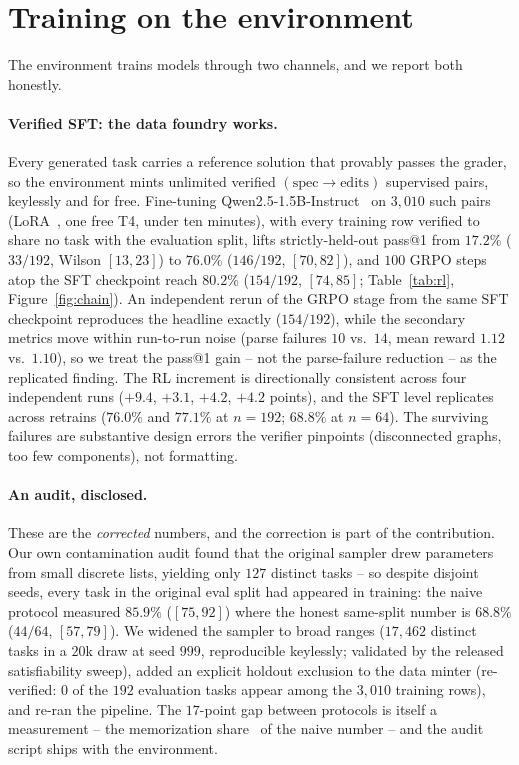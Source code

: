 \documentclass[11pt]{article}
\begin{document}
\section{Training on the environment}
\label{sec:rl}
The environment trains models through two channels, and we report both honestly.

\paragraph{Verified SFT: the data foundry works.} Every generated task carries a reference solution that provably passes the grader, so the environment mints unlimited verified $(\text{spec}\!\to\!\text{edits})$ supervised pairs, keylessly and for free. Fine-tuning Qwen2.5-1.5B-Instruct~\cite{qwen25} on $3{,}010$ such pairs (LoRA~\cite{lora}, one free T4, under ten minutes), with every training row verified to share no task with the evaluation split, lifts strictly-held-out pass@1 from $17.2\%$ ($33/192$, Wilson $[13,23]$) to $76.0\%$ ($146/192$, $[70,82]$), and $100$ GRPO steps atop the SFT checkpoint reach $\mathbf{80.2\%}$ ($154/192$, $[74,85]$; Table~\ref{tab:rl}, Figure~\ref{fig:chain}). An independent rerun of the GRPO stage from the same SFT checkpoint reproduces the headline exactly ($154/192$), while the secondary metrics move within run-to-run noise (parse failures $10$ vs.\ $14$, mean reward $1.12$ vs.\ $1.10$), so we treat the pass@1 gain -- not the parse-failure reduction -- as the replicated finding. The RL increment is directionally consistent across four independent runs ($+9.4$, $+3.1$, $+4.2$, $+4.2$ points), and the SFT level replicates across retrains ($76.0\%$ and $77.1\%$ at $n{=}192$; $68.8\%$ at $n{=}64$). The surviving failures are substantive design errors the verifier pinpoints (disconnected graphs, too few components), not formatting.

\paragraph{An audit, disclosed.} These are the \emph{corrected} numbers, and the correction is part of the contribution. Our own contamination audit found that the original sampler drew parameters from small discrete lists, yielding only $127$ distinct tasks -- so despite disjoint seeds, every task in the original eval split had appeared in training: the naive protocol measured $85.9\%$ ($[75,92]$) where the honest same-split number is $68.8\%$ ($44/64$, $[57,79]$). We widened the sampler to broad ranges ($17{,}462$ distinct tasks in a $20$k draw at seed $999$, reproducible keylessly; validated by the released satisfiability sweep), added an explicit holdout exclusion to the data minter (re-verified: $0$ of the $192$ evaluation tasks appear among the $3{,}010$ training rows), and re-ran the pipeline. The $17$-point gap between protocols is itself a measurement -- the memorization share~\cite{carlini} of the naive number -- and the audit script ships with the environment.
\end{document}

